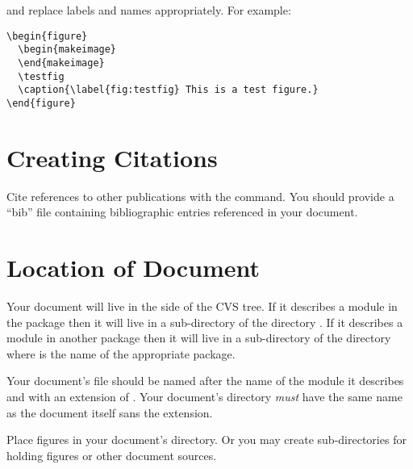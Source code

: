 \documentclass[11pt]{article}
\begin{document}


and replace labels and names appropriately.  For example:

\begin{verbatim}
\begin{figure}
  \begin{makeimage}
  \end{makeimage}
  \testfig
  \caption{\label{fig:testfig} This is a test figure.}
\end{figure}
\end{verbatim}


\section{Creating Citations}

Cite references to other publications with the  command.
You should provide a ``bib'' file containing bibliographic entries
referenced in your document.



\section{Location of Document}

Your document will live in the  side of the CVS tree.  If it
describes a module in the \sr{} package then it will live in a
sub-directory of the directory .  If it
describes a module in another package then it will live in a sub-directory
of the directory  where
 is the name of the appropriate package.

Your document's file should be named after the name of the module it
describes and with an extension of .  Your document's
directory \emph{must} have the same name as the document itself sans the
 extension.

Place figures in your document's directory.  Or you may create sub-directories
for holding figures or other document sources.

\begin{htmlonly}

\end{htmlonly}
\end{document}
